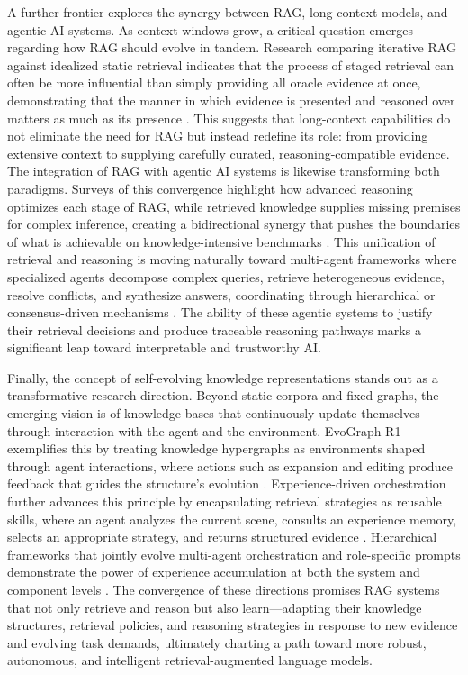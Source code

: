 \documentclass[11pt]{article}
\begin{document}
A further frontier explores the synergy between RAG, long-context models, and agentic AI systems. As context windows grow, a critical question emerges regarding how RAG should evolve in tandem. Research comparing iterative RAG against idealized static retrieval indicates that the process of staged retrieval can often be more influential than simply providing all oracle evidence at once, demonstrating that the manner in which evidence is presented and reasoned over matters as much as its presence \cite{ref170}. This suggests that long-context capabilities do not eliminate the need for RAG but instead redefine its role: from providing extensive context to supplying carefully curated, reasoning-compatible evidence. The integration of RAG with agentic AI systems is likewise transforming both paradigms. Surveys of this convergence highlight how advanced reasoning optimizes each stage of RAG, while retrieved knowledge supplies missing premises for complex inference, creating a bidirectional synergy that pushes the boundaries of what is achievable on knowledge-intensive benchmarks \cite{ref21,ref53}. This unification of retrieval and reasoning is moving naturally toward multi-agent frameworks where specialized agents decompose complex queries, retrieve heterogeneous evidence, resolve conflicts, and synthesize answers, coordinating through hierarchical or consensus-driven mechanisms \cite{ref320,ref310}. The ability of these agentic systems to justify their retrieval decisions and produce traceable reasoning pathways marks a significant leap toward interpretable and trustworthy AI.

Finally, the concept of self-evolving knowledge representations stands out as a transformative research direction. Beyond static corpora and fixed graphs, the emerging vision is of knowledge bases that continuously update themselves through interaction with the agent and the environment. EvoGraph-R1 exemplifies this by treating knowledge hypergraphs as environments shaped through agent interactions, where actions such as expansion and editing produce feedback that guides the structure's evolution \cite{ref42}. Experience-driven orchestration further advances this principle by encapsulating retrieval strategies as reusable skills, where an agent analyzes the current scene, consults an experience memory, selects an appropriate strategy, and returns structured evidence \cite{ref612}. Hierarchical frameworks that jointly evolve multi-agent orchestration and role-specific prompts demonstrate the power of experience accumulation at both the system and component levels \cite{ref323}. The convergence of these directions promises RAG systems that not only retrieve and reason but also learn---adapting their knowledge structures, retrieval policies, and reasoning strategies in response to new evidence and evolving task demands, ultimately charting a path toward more robust, autonomous, and intelligent retrieval-augmented language models.
\end{document}
